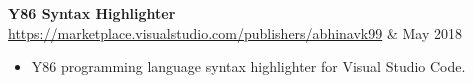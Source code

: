 \documentclass[letterpaper,11pt]{article}
\makeatletter
\newcommand{\resumeItem}[1]{
  \item\small{
    #1 \vspace{-2pt}
  }
}
\newcommand{\resumeProject}[3]{
  \vspace{-1pt}\item[]
    \begin{tabular*}\textwidth{l@{\extracolsep{\fill}}r}
      \textbf{#1} \space\small{\url{#2}} & #3 \\
    \end{tabular*}\vspace{-5pt}
}
\newcommand{\resumeItemListStart}{\begin{itemize}}
\newcommand{\resumeItemListEnd}{\end{itemize}\vspace{-5pt}}
\makeatother
\begin{document}
    \resumeProject
      {Y86 Syntax Highlighter}{https://marketplace.visualstudio.com/publishers/abhinavk99}{May 2018}
      \resumeItemListStart
        \resumeItem
          {Y86 programming language syntax highlighter for Visual Studio Code.}
      \resumeItemListEnd
      
  

      


        
\end{document}
